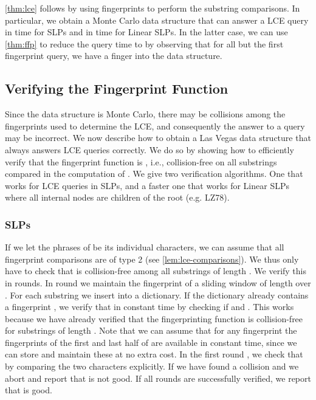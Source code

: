 \documentclass[11pt]{article}
\begin{document}
\noindent \autoref{thm:lce} follows by using fingerprints to perform the substring comparisons. In particular, we obtain a Monte Carlo data structure that can answer a LCE query in  time for SLPs and in  time for Linear SLPs. In the latter case, we can use \autoref{thm:ffp} to reduce the query time to  by observing that for all but the first fingerprint query, we have a finger into the data structure. 






\subsection{Verifying the Fingerprint Function}
Since the data structure is Monte Carlo, there may be collisions among the fingerprints used to determine the LCE, and consequently the answer to a query may be incorrect. We now describe how to obtain a Las Vegas data structure that always answers LCE queries correctly. We do so by showing how to efficiently verify that the fingerprint function  is , i.e., collision-free on all substrings compared in the computation of . We give two verification algorithms. One that works for LCE queries in SLPs, and a faster one that works for Linear SLPs where all internal nodes are children of the root (e.g. LZ78).






\subsubsection{SLPs}
If we let the phrases of  be its individual characters, we can assume that all fingerprint comparisons are of type 2 (see \autoref{lem:lce-comparisons}). We thus only have to check that  is collision-free among all substrings of length . We verify this in  rounds. In round  we maintain the fingerprint of a sliding window of length  over . For each substring  we insert  into a dictionary. If the dictionary already contains a fingerprint , we verify that  in constant time by checking if  and . This works because we have already verified that the fingerprinting function is collision-free for substrings of length . Note that we can assume that for any fingerprint  the fingerprints of the first and last half of  are available in constant time, since we can store and maintain these at no extra cost. In the first round , we check that  by comparing the two characters explicitly. If  we have found a collision and we abort and report that  is not good. If all rounds are successfully verified, we report that  is good.
\end{document}
